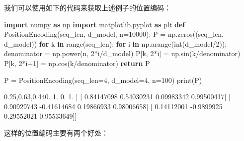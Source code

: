 \documentclass[
]{article}
\newenvironment{Shaded}{}{}
\newcommand{\BuiltInTok}[1]{\textcolor[rgb]{0.00,0.50,0.00}{#1}}
\newcommand{\ControlFlowTok}[1]{\textcolor[rgb]{0.00,0.44,0.13}{\textbf{#1}}}
\newcommand{\DecValTok}[1]{\textcolor[rgb]{0.25,0.63,0.44}{#1}}
\newcommand{\FloatTok}[1]{\textcolor[rgb]{0.25,0.63,0.44}{#1}}
\newcommand{\ImportTok}[1]{\textcolor[rgb]{0.00,0.50,0.00}{\textbf{#1}}}
\newcommand{\KeywordTok}[1]{\textcolor[rgb]{0.00,0.44,0.13}{\textbf{#1}}}
\newcommand{\NormalTok}[1]{#1}
\newcommand{\OperatorTok}[1]{\textcolor[rgb]{0.40,0.40,0.40}{#1}}
\begin{document}
我们可以使用如下的代码来获取上述例子的位置编码：

\begin{Shaded}
\begin{Highlighting}[]
\ImportTok{import}\NormalTok{ numpy }\ImportTok{as}\NormalTok{ np}
\ImportTok{import}\NormalTok{ matplotlib.pyplot }\ImportTok{as}\NormalTok{ plt}
\KeywordTok{def}\NormalTok{ PositionEncoding(seq\_len, d\_model, n}\OperatorTok{=}\DecValTok{10000}\NormalTok{):}
\NormalTok{    P }\OperatorTok{=}\NormalTok{ np.zeros((seq\_len, d\_model))}
    \ControlFlowTok{for}\NormalTok{ k }\KeywordTok{in} \BuiltInTok{range}\NormalTok{(seq\_len):}
        \ControlFlowTok{for}\NormalTok{ i }\KeywordTok{in}\NormalTok{ np.arange(}\BuiltInTok{int}\NormalTok{(d\_model}\OperatorTok{/}\DecValTok{2}\NormalTok{)):}
\NormalTok{            denominator }\OperatorTok{=}\NormalTok{ np.power(n, }\DecValTok{2}\OperatorTok{*}\NormalTok{i}\OperatorTok{/}\NormalTok{d\_model)}
\NormalTok{            P[k, }\DecValTok{2}\OperatorTok{*}\NormalTok{i] }\OperatorTok{=}\NormalTok{ np.sin(k}\OperatorTok{/}\NormalTok{denominator)}
\NormalTok{            P[k, }\DecValTok{2}\OperatorTok{*}\NormalTok{i}\OperatorTok{+}\DecValTok{1}\NormalTok{] }\OperatorTok{=}\NormalTok{ np.cos(k}\OperatorTok{/}\NormalTok{denominator)}
    \ControlFlowTok{return}\NormalTok{ P}

\NormalTok{P }\OperatorTok{=}\NormalTok{ PositionEncoding(seq\_len}\OperatorTok{=}\DecValTok{4}\NormalTok{, d\_model}\OperatorTok{=}\DecValTok{4}\NormalTok{, n}\OperatorTok{=}\DecValTok{100}\NormalTok{)}
\BuiltInTok{print}\NormalTok{(P)}
\end{Highlighting}
\end{Shaded}

\begin{Shaded}
\begin{Highlighting}[]
\NormalTok{[[ }\FloatTok{0.}          \FloatTok{1.}          \FloatTok{0.}          \FloatTok{1.}\NormalTok{        ]}
\NormalTok{ [ }\FloatTok{0.84147098}  \FloatTok{0.54030231}  \FloatTok{0.09983342}  \FloatTok{0.99500417}\NormalTok{]}
\NormalTok{ [ }\FloatTok{0.90929743} \OperatorTok{{-}}\FloatTok{0.41614684}  \FloatTok{0.19866933}  \FloatTok{0.98006658}\NormalTok{]}
\NormalTok{ [ }\FloatTok{0.14112001} \OperatorTok{{-}}\FloatTok{0.9899925}   \FloatTok{0.29552021}  \FloatTok{0.95533649}\NormalTok{]]}
\end{Highlighting}
\end{Shaded}

这样的位置编码主要有两个好处：
\end{document}
